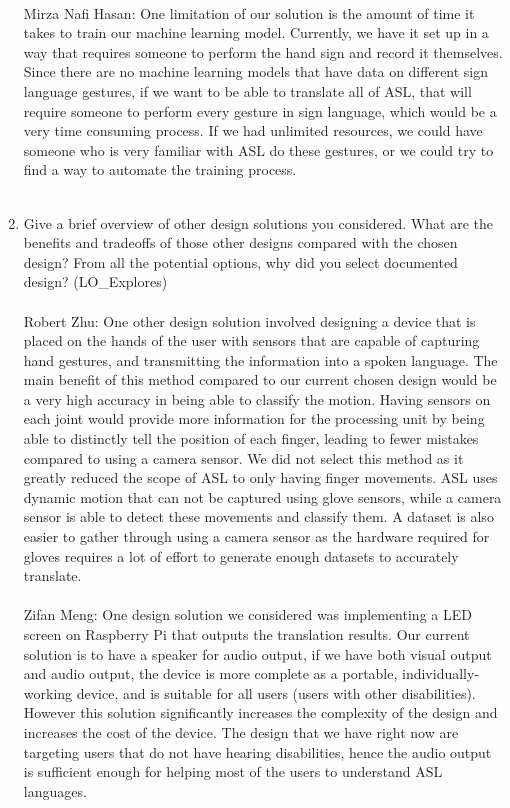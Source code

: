 \documentclass[12pt, titlepage]{article}
\begin{document}
\begin{enumerate}
  \\
    Mirza Nafi Hasan: One limitation of our solution is the amount of time it takes to train our machine learning model. Currently, we have it set up in a way 
that requires someone to perform the hand sign and record it themselves. Since there are no machine learning models that have data on different sign language
gestures, if we want to be able to translate all of ASL, that will require someone to perform every gesture in sign language, which would be a very time 
consuming process. If we had unlimited resources, we could have someone who is very familiar with ASL do these gestures, or we could try to find a way to
automate the training process.
  \\
  ~\\

  
  \item Give a brief overview of other design solutions you considered.  What
  are the benefits and tradeoffs of those other designs compared with the chosen
  design?  From all the potential options, why did you select documented design?
  (LO\_Explores)
  ~\\
  \\
  Robert Zhu: One other design solution involved designing a device that is placed on the hands of the user with sensors that are capable of capturing 
  hand gestures, and transmitting the information into a spoken language. The main benefit of this method compared to our current chosen design would 
  be a very high accuracy in being able to classify the motion. Having sensors on each joint would provide more information for the processing unit by 
  being able to distinctly tell the position of each finger, leading to fewer mistakes compared to using a camera sensor. We did not select this method 
  as it greatly reduced the scope of ASL to only having finger movements. ASL uses dynamic motion that can not be captured using glove sensors, while a 
  camera sensor is able to detect these movements and classify them. A dataset is also easier to gather through using a camera sensor as the hardware 
  required for gloves requires a lot of effort to generate enough datasets to accurately translate.\\
  \\
  Zifan Meng: One design solution we considered was implementing a LED screen on Raspberry Pi that outputs the translation results. Our current solution is to have a speaker for audio output, if we have both visual output and audio output, the device is more complete as a portable, individually-working device, and is suitable for all users (users with other disabilities). However this solution significantly increases the complexity of the design and increases the cost of the device. The design that we have right now are targeting users that do not have hearing disabilities, hence the audio output is sufficient enough for helping most of the users to understand ASL languages.\\

\end{enumerate}
\end{document}
